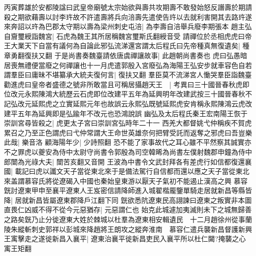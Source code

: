 丙寅葬雄於安都陵諡曰武皇帝廟號太宗始欲與壽共攻期壽不敢發始怒反譖壽於期請殺之期欲藉壽以討李玝故不許遣壽將兵向涪壽先遣使告玝以去就利害開其去路玝遂來奔詔以玝為巴郡太守期以壽為梁州刺史屯涪|{
	為李壽自涪舉兵廢李期張本}
趙主弘自齎璽綬詣魏宮|{
	石虎為魏王其所居稱魏宮璽斯氏翻綬音受}
請禪位於丞相虎虎曰帝王大業天下自當有議何為自論此邪弘流涕還宮謂太后程氏曰先帝種真無復遺矣|{
	種章勇翻復扶又翻}
于是尚書奏魏臺請依唐虞禪讓故事|{
	此趙朝尚書奏也}
虎曰弘愚暗居喪無禮便當廢之何禪讓也十一月虎遣郭殷入宮廢弘為海陽王弘安步就車容色自若謂羣臣曰庸昧不堪纂承大統夫復何言|{
	復扶又翻}
羣臣莫不流涕宮人慟哭羣臣詣魏臺勸進虎曰皇帝者盛德之號非所敢當且可稱居攝趙天王　|{
	考異曰三十國晉春秋虎即位改元永熙陳鴻大統歷云石虎即位改建平五年為延興明年改建武按三十國晉春秋不記弘改元延熙虎之立實延熙元年也故誤云永熙弘既號延熙虎安肯稱永熙陳鴻云虎改建平五年為延興即是弘踰年不改元也恐鴻說誤}
幽弘及太后程氏秦王宏南陽王恢于崇訓宮尋皆殺之|{
	虎更太子宮曰崇訓宮弘時年二十一}
西羌大都督姚弋仲稱疾不賀虎累召之乃至正色謂虎曰弋仲常謂大王命世英雄奈何把臂受託而返奪之邪虎曰吾豈樂此哉|{
	樂音洛}
顧海陽年少|{
	少詩照翻}
恐不能了家事故代之耳心雖不平然察其誠實亦不之罪虎以夔安為侍中太尉守尚書令郭殷為司空韓晞為尚書左僕射魏郡申鐘為侍中郎闓為光祿大夫|{
	闓苦亥翻又音開}
王波為中書令文武封拜各有差虎行如信都復還襄國|{
	載記曰虎以讖文天子當從東北來于是備法駕行自信都而還以應之天子當從東北來盖謂慕容氏將從遼碣入中國也秦始皇東游以厭天子氣初不能遏止漢高之興}
慕容皝討遼東甲申至襄平遼東人王岌密信請降師進入城翟楷龎鑒單騎走居就新昌等縣皆降|{
	居就新昌皆屬遼東郡降戶江翻下同}
皝欲悉阬遼東民高詡諫曰遼東之叛實非本圖直畏仁凶威不得不從今元惡猶存|{
	元惡謂仁也}
始克此城遽加夷滅則未下之城無歸善之路矣皝乃止分徙遼東大姓於棘城以杜羣為遼東相安輯遺民　十二月趙徐州從事蘭陵朱縱斬刺史郭祥以彭城來降趙將王朗攻之縱奔淮南　慕容仁遣兵襲新昌督護新興王㝢擊走之遂徙新昌入襄平|{
	遼東治襄平徙新昌吏民入襄平所以杜仁闚?掩襲之心㝢王矩翻}


